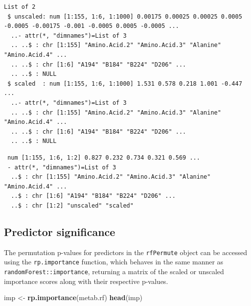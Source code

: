 \documentclass[]{article}
\newenvironment{Shaded}{\begin{snugshade}}{\end{snugshade}}
\newcommand{\KeywordTok}[1]{\textcolor[rgb]{0.13,0.29,0.53}{\textbf{{#1}}}}
\newcommand{\StringTok}[1]{\textcolor[rgb]{0.31,0.60,0.02}{{#1}}}
\newcommand{\NormalTok}[1]{{#1}}
\begin{document}
\begin{verbatim}
List of 2
 $ unscaled: num [1:155, 1:6, 1:1000] 0.00175 0.00025 0.00025 0.0005 -0.0005 -0.00175 -0.001 -0.0005 0.0005 -0.0005 ...
  ..- attr(*, "dimnames")=List of 3
  .. ..$ : chr [1:155] "Amino.Acid.2" "Amino.Acid.3" "Alanine" "Amino.Acid.4" ...
  .. ..$ : chr [1:6] "A194" "B184" "B224" "D206" ...
  .. ..$ : NULL
 $ scaled  : num [1:155, 1:6, 1:1000] 1.531 0.578 0.218 1.001 -0.447 ...
  ..- attr(*, "dimnames")=List of 3
  .. ..$ : chr [1:155] "Amino.Acid.2" "Amino.Acid.3" "Alanine" "Amino.Acid.4" ...
  .. ..$ : chr [1:6] "A194" "B184" "B224" "D206" ...
  .. ..$ : NULL
\end{verbatim}

\begin{Shaded}
\end{Shaded}

\begin{verbatim}
 num [1:155, 1:6, 1:2] 0.827 0.232 0.734 0.321 0.569 ...
 - attr(*, "dimnames")=List of 3
  ..$ : chr [1:155] "Amino.Acid.2" "Amino.Acid.3" "Alanine" "Amino.Acid.4" ...
  ..$ : chr [1:6] "A194" "B184" "B224" "D206" ...
  ..$ : chr [1:2] "unscaled" "scaled"
\end{verbatim}

\subsection{Predictor significance}\label{predictor-significance}

The permutation p-values for predictors in the \texttt{rfPermute} object
can be accessed using the \texttt{rp.importance} function, which behaves
in the same manner as \texttt{randomForest::importance}, returning a
matrix of the scaled or unscaled importance scores along with their
respective p-values.

\begin{Shaded}
\begin{Highlighting}[]
\NormalTok{imp <-}\StringTok{ }\KeywordTok{rp.importance}\NormalTok{(metab.rf)}
\KeywordTok{head}\NormalTok{(imp)}
\end{Highlighting}
\end{Shaded}
\end{document}
